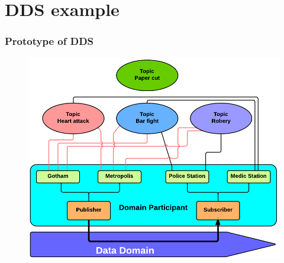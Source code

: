 \documentclass{beamer}
\begin{document}
\section{DDS example}
	\begin{frame}
		\frametitle{Prototype of DDS}
		
		\begin{figure}[hbtp]
		\centering
		\includegraphics[scale=0.33]{Prototype}
		\end{figure}
		
	\end{frame} 
\end{document}
